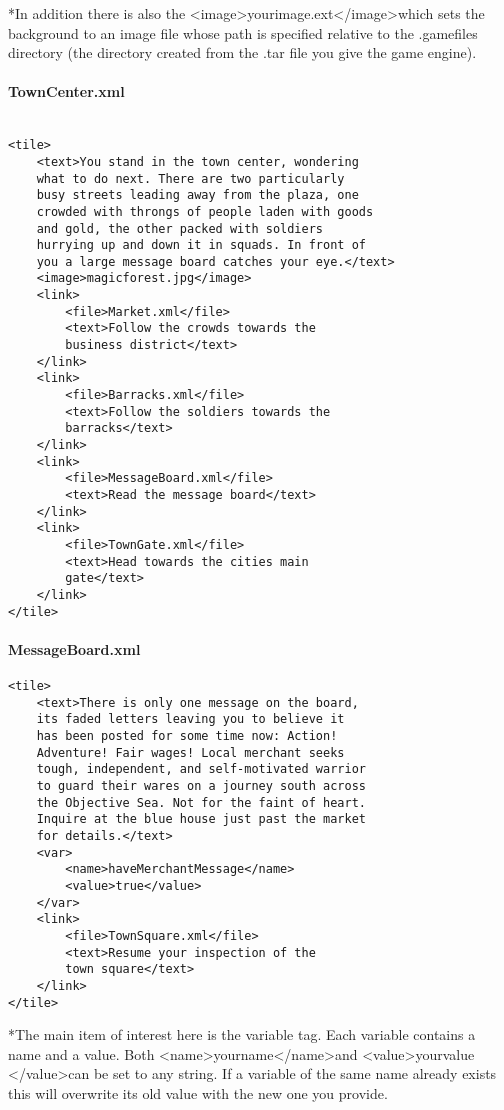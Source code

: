 \documentclass[11pt]{article}
\begin{document}
*In addition there is also the \textless image\textgreater yourimage.ext\textless /image\textgreater which sets the background to an image file whose path is specified relative to the .gamefiles directory (the directory created from the .tar file you give the game engine).


\paragraph{TownCenter.xml}

\begin{lstlisting}[frame=single]

<tile>
	<text>You stand in the town center, wondering 
	what to do next. There are two particularly 
	busy streets leading away from the plaza, one 
	crowded with throngs of people laden with goods 
	and gold, the other packed with soldiers 
	hurrying up and down it in squads. In front of 
	you a large message board catches your eye.</text>
	<image>magicforest.jpg</image>
	<link>
		<file>Market.xml</file>
		<text>Follow the crowds towards the 
		business district</text>
	</link>
	<link>
		<file>Barracks.xml</file>
		<text>Follow the soldiers towards the 
		barracks</text>
	</link>
	<link>
		<file>MessageBoard.xml</file>
		<text>Read the message board</text>
	</link>
	<link>
		<file>TownGate.xml</file>
		<text>Head towards the cities main 
		gate</text>
	</link>
</tile>

\end{lstlisting}


\paragraph{MessageBoard.xml}


\begin{lstlisting}[frame=single]
<tile>
	<text>There is only one message on the board, 
	its faded letters leaving you to believe it 
	has been posted for some time now: Action! 
	Adventure! Fair wages! Local merchant seeks 
	tough, independent, and self-motivated warrior 
	to guard their wares on a journey south across 
	the Objective Sea. Not for the faint of heart. 
	Inquire at the blue house just past the market 
	for details.</text>
	<var>
		<name>haveMerchantMessage</name>
		<value>true</value>
	</var> 
	<link>
		<file>TownSquare.xml</file>
		<text>Resume your inspection of the 
		town square</text>
	</link>
</tile>
\end{lstlisting}
*The main item of interest here is the variable tag. Each variable contains a name and a value. Both \textless name\textgreater yourname\textless /name\textgreater  and \textless value\textgreater yourvalue \textless /value\textgreater  can be set to any string. If a variable of the same name already exists this will overwrite its old value with the new one you provide.
\end{document}
